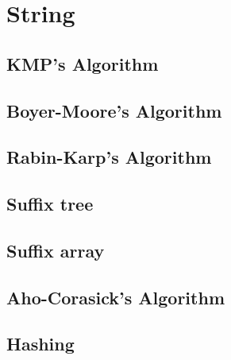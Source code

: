 \chapter{String}
	\section{KMP's Algorithm}
    
	\section{Boyer-Moore's Algorithm}
	\section{Rabin-Karp's Algorithm}
	\section{Suffix tree}
	\section{Suffix array}
	\section{Aho-Corasick's Algorithm}
	\section{Hashing}
